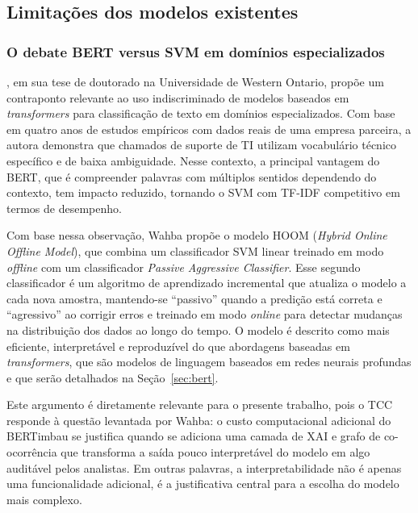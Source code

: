 \documentclass[
    12pt,                %
    openright,           %
    oneside,             %
    a4paper,             %
    english,             %
    brazil               %
]{abntex2}
\begin{document}
\subsection{Limitações dos modelos existentes}
\label{subsec:helpdesk_limitacoes}

\subsubsection{O debate BERT versus SVM em domínios especializados}
\label{subsubsec:helpdesk_debate}

, em sua tese de doutorado na Universidade de Western Ontario, propõe um contraponto relevante ao uso indiscriminado de modelos baseados em \textit{transformers} para classificação de texto em domínios especializados. Com base em quatro anos de estudos empíricos com dados reais de uma empresa parceira, a autora demonstra 
que chamados de suporte de TI utilizam vocabulário técnico específico 
e de baixa ambiguidade. Nesse contexto, a principal vantagem do BERT, que é compreender 
palavras com múltiplos sentidos dependendo do contexto, tem impacto 
reduzido, tornando o SVM com TF-IDF competitivo em termos de 
desempenho.

Com base nessa observação, Wahba propõe o modelo HOOM 
(\textit{Hybrid Online Offline Model}), que combina um classificador SVM linear treinado em modo \textit{offline} com um classificador \textit{Passive Aggressive Classifier}. Esse segundo classificador 
é um algoritmo de aprendizado incremental que atualiza o modelo a cada nova amostra, mantendo-se ``passivo'' quando a predição está correta e ``agressivo'' ao corrigir erros e treinado em modo 
\textit{online} para detectar mudanças na distribuição dos dados ao longo do tempo. O modelo é descrito como mais eficiente, interpretável e reproduzível 
do que abordagens baseadas em \textit{transformers}, que são modelos 
de linguagem baseados em redes neurais profundas e que serão 
detalhados na Seção~\ref{sec:bert}.

Este argumento é diretamente relevante para o presente trabalho, pois o TCC responde à questão levantada por Wahba: o custo computacional adicional do BERTimbau se justifica quando se adiciona uma camada de XAI e grafo de co-ocorrência que transforma a saída pouco interpretável do modelo em algo auditável pelos analistas. Em outras palavras, a interpretabilidade não é apenas uma funcionalidade adicional, é a justificativa central para a escolha do modelo mais complexo.
\end{document}

